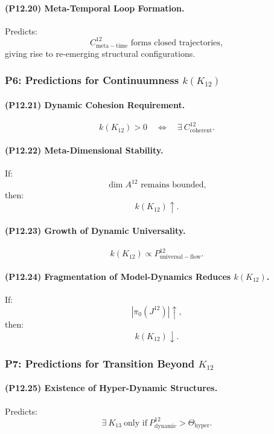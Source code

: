 \paragraph{(P12.20) Meta-Temporal Loop Formation.}
Predicts:
\[
C_{\mathrm{meta-time}}^{12}
\text{ forms closed trajectories},
\]
giving rise to re-emerging structural configurations.

\subsubsection{P6: Predictions for Continuumness $k(K_{12})$}

\paragraph{(P12.21) Dynamic Cohesion Requirement.}
\[
k(K_{12}) > 0 
\quad\Leftrightarrow\quad 
\exists\ C^{12}_{\mathrm{coherent}}.
\]

\paragraph{(P12.22) Meta-Dimensional Stability.}
If:
\[
\dim A^{12} \text{ remains bounded},
\]
then:
\[
k(K_{12}) \uparrow.
\]

\paragraph{(P12.23) Growth of Dynamic Universality.}
\[
k(K_{12}) \propto P_{\mathrm{universal-flow}}^{12}.
\]

\paragraph{(P12.24) Fragmentation of Model-Dynamics Reduces $k(K_{12})$.}
If:
\[
|\pi_0(J^{12})| \uparrow,
\]
then:
\[
k(K_{12}) \downarrow.
\]

\subsubsection{P7: Predictions for Transition Beyond $K_{12}$}

\paragraph{(P12.25) Existence of Hyper-Dynamic Structures.}
Predicts:
\[
\exists\ K_{13}\ \text{only if}\ 
P_{\mathrm{dynamic}}^{12} > \Theta_{\mathrm{hyper}}.
\]

